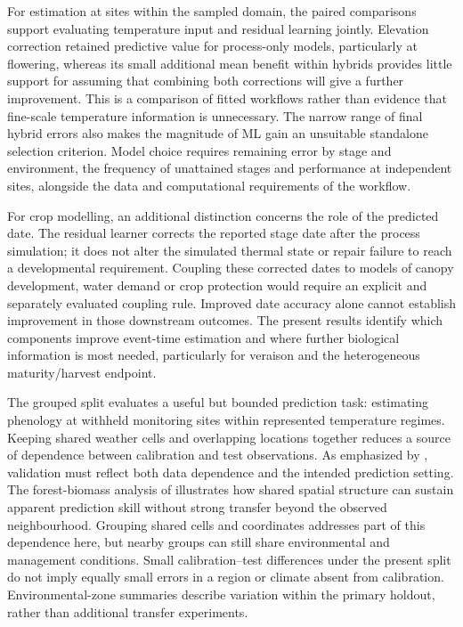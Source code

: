 \documentclass[a4paper,12pt]{article}
\begin{document}
For estimation at sites within the sampled domain, the paired comparisons support evaluating temperature input and residual learning jointly. Elevation correction retained predictive value for process-only models, particularly at flowering, whereas its small additional mean benefit within hybrids provides little support for assuming that combining both corrections will give a further improvement. This is a comparison of fitted workflows rather than evidence that fine-scale temperature information is unnecessary. The narrow range of final hybrid errors also makes the magnitude of ML gain an unsuitable standalone selection criterion. Model choice requires remaining error by stage and environment, the frequency of unattained stages and performance at independent sites, alongside the data and computational requirements of the workflow.

For crop modelling, an additional distinction concerns the role of the predicted date. The residual learner corrects the reported stage date after the process simulation; it does not alter the simulated thermal state or repair failure to reach a developmental requirement. Coupling these corrected dates to models of canopy development, water demand or crop protection would require an explicit and separately evaluated coupling rule. Improved date accuracy alone cannot establish improvement in those downstream outcomes. The present results identify which components improve event-time estimation and where further biological information is most needed, particularly for veraison and the heterogeneous maturity/harvest endpoint.

The grouped split evaluates a useful but bounded prediction task: estimating phenology at withheld monitoring sites within represented temperature regimes. Keeping shared weather cells and overlapping locations together reduces a source of dependence between calibration and test observations. As emphasized by \citet{robertsCrossvalidationStrategiesData2017}, validation must reflect both data dependence and the intended prediction setting. The forest-biomass analysis of \citet{plotonSpatialValidation2020} illustrates how shared spatial structure can sustain apparent prediction skill without strong transfer beyond the observed neighbourhood. Grouping shared cells and coordinates addresses part of this dependence here, but nearby groups can still share environmental and management conditions. Small calibration--test differences under the present split do not imply equally small errors in a region or climate absent from calibration. Environmental-zone summaries describe variation within the primary holdout, rather than additional transfer experiments.
\end{document}
